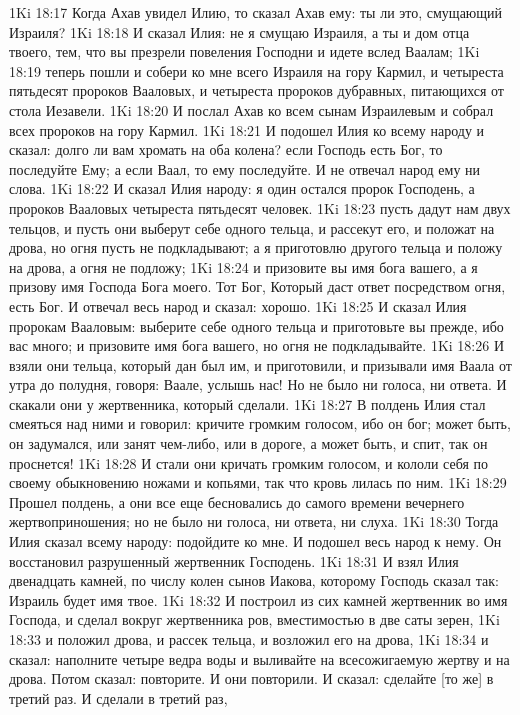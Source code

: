 1Ki 18:17  Когда Ахав увидел Илию, то сказал Ахав ему: ты ли это, смущающий Израиля?
1Ki 18:18  И сказал Илия: не я смущаю Израиля, а ты и дом отца твоего, тем, что вы презрели повеления Господни и идете вслед Ваалам;
1Ki 18:19  теперь пошли и собери ко мне всего Израиля на гору Кармил, и четыреста пятьдесят пророков Вааловых, и четыреста пророков дубравных, питающихся от стола Иезавели.
1Ki 18:20  И послал Ахав ко всем сынам Израилевым и собрал всех пророков на гору Кармил.
1Ki 18:21  И подошел Илия ко всему народу и сказал: долго ли вам хромать на оба колена? если Господь есть Бог, то последуйте Ему; а если Ваал, то ему последуйте. И не отвечал народ ему ни слова.
1Ki 18:22  И сказал Илия народу: я один остался пророк Господень, а пророков Вааловых четыреста пятьдесят человек.
1Ki 18:23  пусть дадут нам двух тельцов, и пусть они выберут себе одного тельца, и рассекут его, и положат на дрова, но огня пусть не подкладывают; а я приготовлю другого тельца и положу на дрова, а огня не подложу;
1Ki 18:24  и призовите вы имя бога вашего, а я призову имя Господа Бога моего. Тот Бог, Который даст ответ посредством огня, есть Бог. И отвечал весь народ и сказал: хорошо.
1Ki 18:25  И сказал Илия пророкам Вааловым: выберите себе одного тельца и приготовьте вы прежде, ибо вас много; и призовите имя бога вашего, но огня не подкладывайте.
1Ki 18:26  И взяли они тельца, который дан был им, и приготовили, и призывали имя Ваала от утра до полудня, говоря: Ваале, услышь нас! Но не было ни голоса, ни ответа. И скакали они у жертвенника, который сделали.
1Ki 18:27  В полдень Илия стал смеяться над ними и говорил: кричите громким голосом, ибо он бог; может быть, он задумался, или занят чем-либо, или в дороге, а может быть, и спит, так он проснется!
1Ki 18:28  И стали они кричать громким голосом, и кололи себя по своему обыкновению ножами и копьями, так что кровь лилась по ним.
1Ki 18:29  Прошел полдень, а они все еще бесновались до самого времени вечернего жертвоприношения; но не было ни голоса, ни ответа, ни слуха.
1Ki 18:30  Тогда Илия сказал всему народу: подойдите ко мне. И подошел весь народ к нему. Он восстановил разрушенный жертвенник Господень.
1Ki 18:31  И взял Илия двенадцать камней, по числу колен сынов Иакова, которому Господь сказал так: Израиль будет имя твое.
1Ki 18:32  И построил из сих камней жертвенник во имя Господа, и сделал вокруг жертвенника ров, вместимостью в две саты зерен,
1Ki 18:33  и положил дрова, и рассек тельца, и возложил его на дрова,
1Ki 18:34  и сказал: наполните четыре ведра воды и выливайте на всесожигаемую жертву и на дрова. Потом сказал: повторите. И они повторили. И сказал: сделайте [то же] в третий раз. И сделали в третий раз,
